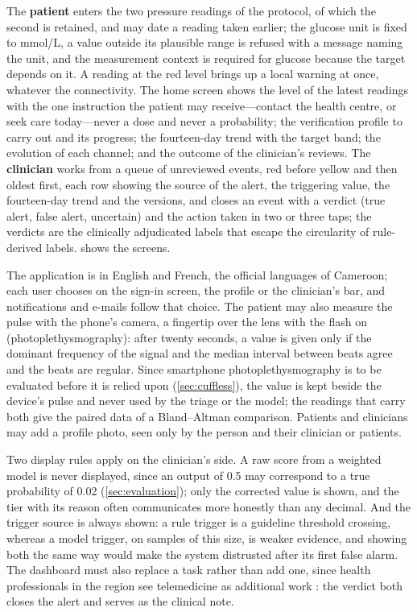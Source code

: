 The \textbf{patient} enters the two pressure readings of the protocol, of which the second is retained, and may date a reading taken earlier; the glucose unit is fixed to mmol/L, a value outside its plausible range is refused with a message naming the unit, and the measurement context is required for glucose because the target depends on it. A reading at the red level brings up a local warning at once, whatever the connectivity. The home screen shows the level of the latest readings with the one instruction the patient may receive---contact the health centre, or seek care today---never a dose and never a probability; the verification profile to carry out and its progress; the fourteen-day trend with the target band; the evolution of each channel; and the outcome of the clinician's reviews. The \textbf{clinician} works from a queue of unreviewed events, red before yellow and then oldest first, each row showing the source of the alert, the triggering value, the fourteen-day trend and the versions, and closes an event with a verdict (true alert, false alert, uncertain) and the action taken in two or three taps; the verdicts are the clinically adjudicated labels that escape the circularity of rule-derived labels.  shows the screens.

The application is in English and French, the official languages of Cameroon; each user chooses on the sign-in screen, the profile or the clinician's bar, and notifications and e-mails follow that choice. The patient may also measure the pulse with the phone's camera, a fingertip over the lens with the flash on (photoplethysmography): after twenty seconds, a value is given only if the dominant frequency of the signal and the median interval between beats agree and the beats are regular. Since smartphone photoplethysmography is to be evaluated before it is relied upon (\cref{sec:cuffless}), the value is kept beside the device's pulse and never used by the triage or the model; the readings that carry both give the paired data of a Bland--Altman comparison. Patients and clinicians may add a profile photo, seen only by the person and their clinician or patients.

Two display rules apply on the clinician's side. A raw score from a weighted model is never displayed, since an output of 0.5 may correspond to a true probability of 0.02 (\cref{sec:evaluation}); only the corrected value is shown, and the tier with its reason often communicates more honestly than any decimal. And the trigger source is always shown: a rule trigger is a guideline threshold crossing, whereas a model trigger, on samples of this size, is weaker evidence, and showing both the same way would make the system distrusted after its first false alarm. The dashboard must also replace a task rather than add one, since health professionals in the region see telemedicine as additional work \parencite{dodoo2022}: the verdict both closes the alert and serves as the clinical note.

